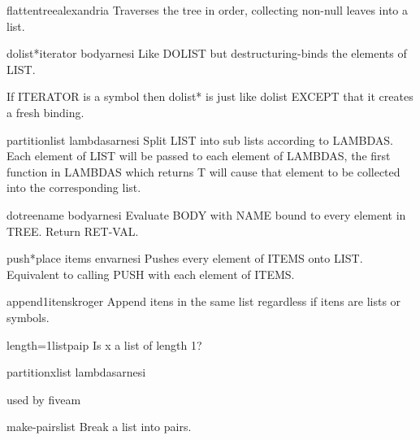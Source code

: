 \begin{function}{flatten}{tree}{alexandria}{}
  Traverses the tree in order, collecting non-null leaves into a list.
\end{function}

\begin{macro}{dolist*}{iterator \body body}{arnesi}{}
  Like DOLIST but destructuring-binds the elements of LIST.

If ITERATOR is a symbol then dolist* is just like dolist EXCEPT
that it creates a fresh binding.
\end{macro}

\begin{function}{partition}{list \rest lambdas}{arnesi}{}
  Split LIST into sub lists according to LAMBDAS. Each element of LIST
  will be passed to each element of LAMBDAS, the first function in
  LAMBDAS which returns T will cause that element to be collected into
  the corresponding list.
\end{function}

\begin{macro}{dotree}{name \body body}{arnesi}{}
  Evaluate BODY with NAME bound to every element in TREE. Return RET-VAL.
\end{macro}

\begin{macro}{push*}{place \rest items \env env}{arnesi}{}
  Pushes every element of ITEMS onto LIST. Equivalent to calling PUSH
  with each element of ITEMS.
\end{macro}

\begin{function}{append1}{\rest itens}{kroger}{}
  Append itens in the same list regardless if itens are lists or
  symbols.
\end{function}

\begin{function}{length=1}{list}{paip}{}
  Is x a list of length 1?
\end{function}

\begin{function}{partitionx}{list \rest lambdas}{arnesi}{}

  used by fiveam
\end{function}

\begin{function}{make-pairs}{list}{}{}
  Break a list into pairs. 
\end{function}

